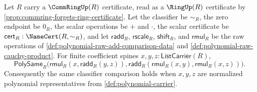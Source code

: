 \begin{theorem}
\label{thm:polynomial-raw-multiplication-left-distributes-over-raw-addition}
Let $R$ carry a $\CommRingUp(R)$ certificate, read as a $\RingUp(R)$ certificate by \autoref{prop:commring-forgets-ring-certificate}. Let the classifier be $\sim_R$, the zero endpoint be $0_R$, the scalar operations be $+$ and $\cdot$, the scalar certificate be $\mathsf{cert}_R:\NameCert(R,\sim_R)$, and let $\mathsf{radd}_R$, $\mathsf{rscale}_R$, $\mathsf{shift}_R$, and $\mathsf{rmul}_R$ be the raw operations of \autoref{def:polynomial-raw-add-comparison-data} and \autoref{def:polynomial-raw-cauchy-product}. For finite coefficient spines $x,y,z:\mathsf{ListCarrier}(R)$,
$$
\mathsf{PolySame}_R\bigl(\mathsf{rmul}_R(x,\mathsf{radd}_R(y,z)),\mathsf{radd}_R(\mathsf{rmul}_R(x,y),\mathsf{rmul}_R(x,z))\bigr).
$$
Consequently the same classifier comparison holds when $x,y,z$ are normalized polynomial representatives from \autoref{def:polynomial-carrier}.
\end{theorem}
